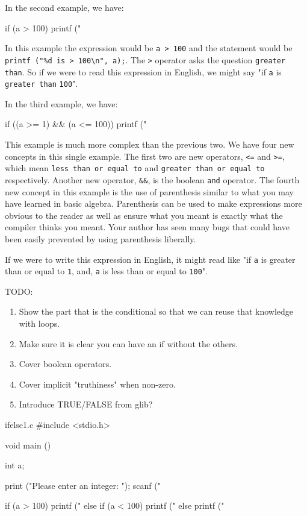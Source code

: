 In the second example, we have:

\begin{code}{}
if (a > 100) {
    printf ("%
}
\end{code}

In this example the expression would be \verb|a > 100| and the statement
would be \verb|printf ("%d is > 100\n", a);|. The \verb|>| operator asks
the question \verb|greater than|. So if we were to read this expression in
English, we might say "if \verb|a| is \verb|greater than| \verb|100|".

In the third example, we have:

\begin{code}{}
if ((a >= 1) && (a <= 100)) {
    printf ("%
}
\end{code}

This example is much more complex than the previous two.  We have four new
concepts in this single example. The first two are new operators, \verb|<=| and
\verb|>=|, which mean \verb|less than or equal to| and \verb|greater than or equal to|
respectively. Another new operator, \verb|&&|, is the boolean
\verb|and| operator. The fourth new concept in this example is the use of
parenthesis similar to what you may have learned in basic algebra.  Parenthesis
can be used to make expressions more obvious to the reader as well as ensure
what you meant is exactly what the compiler thinks you meant. Your author has
seen many bugs that could have been easily prevented by using parenthesis
liberally.

If we were to write this expression in English, it might read like "if \verb|a|
is greater than or equal to \verb|1|, and, \verb|a| is less than or equal to
\verb|100|".

TODO:

\begin{enumerate}
\item Show the part that is the conditional so that we can reuse that
      knowledge with loops.
\item Make sure it is clear you can have an if without the others.
\item Cover boolean operators.
\item Cover implicit "truthiness" when non-zero.
\item Introduce TRUE/FALSE from glib?
\end{enumerate}

\begin{code}{ifelse1.c}
#include <stdio.h>

void main ()
{
    int a;

    print ("Please enter an integer:  ");
    scanf ("%

    if (a > 100) {
        printf ("%
    } else if (a < 100) {
        printf ("%
    } else {
        printf ("%
    }
}
\end{code}

